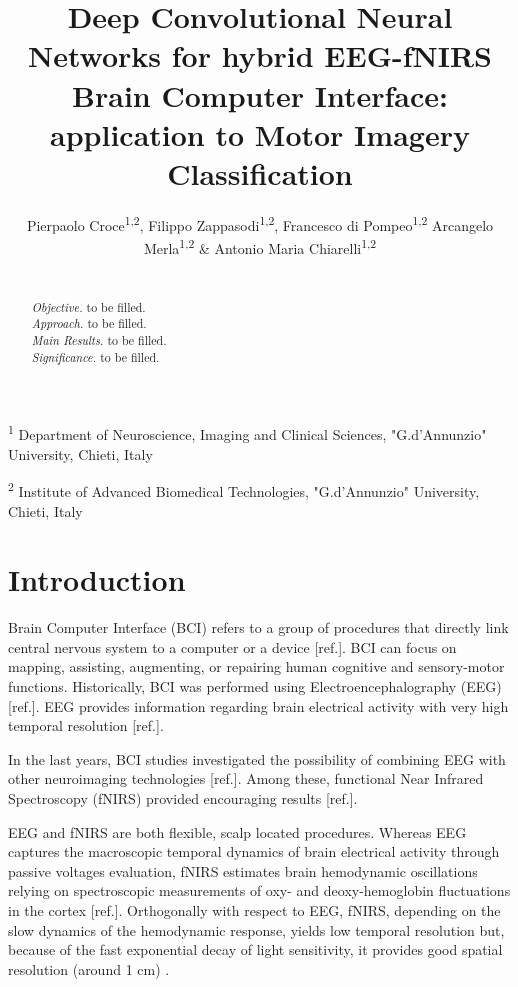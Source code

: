 \documentclass[12pt ]{iopart}
\begin{document}
\title[CNN EEG-fNIRS]{Deep Convolutional Neural Networks for  hybrid EEG-fNIRS Brain Computer Interface: application to Motor Imagery Classification}

\author{Pierpaolo Croce\textsuperscript{1,2}, Filippo Zappasodi\textsuperscript{1,2}, Francesco di Pompeo\textsuperscript{1,2} Arcangelo Merla\textsuperscript{1,2} \& Antonio Maria Chiarelli\textsuperscript{1,2}}

\vspace{10pt}
\begin{indented}
\item[] \textsuperscript{1} Department of Neuroscience, Imaging and Clinical Sciences, "G.d’Annunzio" University, Chieti, Italy
\item[] \textsuperscript{2} Institute of Advanced Biomedical Technologies, "G.d’Annunzio" University, Chieti, Italy
\end{indented}

\begin{abstract}
	\\
	\textit{Objective.} to be filled. \\
	\textit{Approach.} to be filled.\\
	\textit{Main Results.} to be filled. \\
	\textit{Significance.} to be filled.
\end{abstract}


\section{Introduction}

Brain Computer Interface (BCI) refers to a group of procedures that directly link  central nervous system to a computer or a device [ref.]. BCI can focus on mapping, assisting, augmenting, or repairing human cognitive and sensory-motor functions. 
Historically, BCI was performed using Electroencephalography (EEG) [ref.]. EEG  provides information regarding brain electrical activity with very high temporal resolution [ref.]. 

In the last years, BCI studies investigated the possibility of combining EEG with other neuroimaging technologies [ref.]. Among these, functional Near Infrared Spectroscopy (fNIRS) provided encouraging results [ref.]. 

EEG and fNIRS are both flexible, scalp located procedures. Whereas EEG captures the macroscopic temporal dynamics of brain electrical activity through passive voltages evaluation, fNIRS estimates brain hemodynamic oscillations  relying on spectroscopic measurements of oxy- and deoxy-hemoglobin fluctuations in the cortex [ref.]. Orthogonally with respect to EEG, fNIRS, depending on the slow dynamics of the hemodynamic response, yields low temporal resolution but, because of the fast exponential decay of light sensitivity, it provides good spatial resolution (around 1 cm) \parencite{chiarelli2016combining}. 
\end{document}

